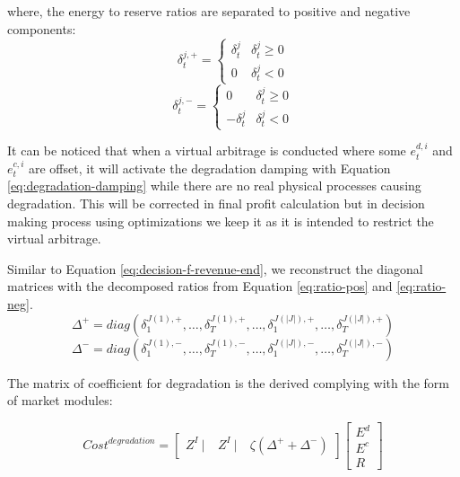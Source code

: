 where, the energy to reserve ratios are separated to positive and negative components:
\begin{equation}
\label{eq:ratio-pos}
\delta_t^{j,+} = \begin{cases}
\delta_t^j & \delta_t^j  \geq 0\\
0 & \delta_t^j  < 0
\end{cases}
\end{equation}
\begin{equation}
\label{eq:ratio-neg}
\delta_t^{j,-} = \begin{cases}
0 & \delta_t^j  \geq 0\\
-\delta_t^j & \delta_t^j  < 0
\end{cases}
\end{equation}

It can be noticed that when a virtual arbitrage is conducted where some $e_t^{d,i}$ and $e_t^{c,i}$ are offset, it will activate the degradation damping with Equation \eqref{eq:degradation-damping} while there are no real physical processes causing degradation. This will be corrected in final profit calculation but in decision making process using optimizations we keep it as it is intended to restrict the virtual arbitrage.

Similar to Equation \eqref{eq:decision-f-revenue-end}, we reconstruct the diagonal matrices with the decomposed ratios from Equation \eqref{eq:ratio-pos} and \eqref{eq:ratio-neg}.
\begin{equation}
\Delta^+ = diag (
\delta_1^{J(1),+}, \dots , \delta_T^{J(1),+}, \dots, \delta_1^{J(|J|),+}, \dots, \delta_T^{J(|J|),+})
\end{equation}
\begin{equation}
\Delta^- = diag (
\delta_1^{J(1),-}, \dots , \delta_T^{J(1),-}, \dots, \delta_1^{J(|J|),-}, \dots, \delta_T^{J(|J|),-})
\end{equation}

The matrix of coefficient for degradation is the derived complying with the form of market modules:

\begin{equation*}
Cost^{degradation} = \begin{bmatrix}
Z^{I}~|~&Z^{I}~|~& \zeta (\Delta^{+} +\Delta^{-})
\end{bmatrix} \begin{bmatrix}
E^d \\ E^c \\ R
\end{bmatrix}
\end{equation*}

